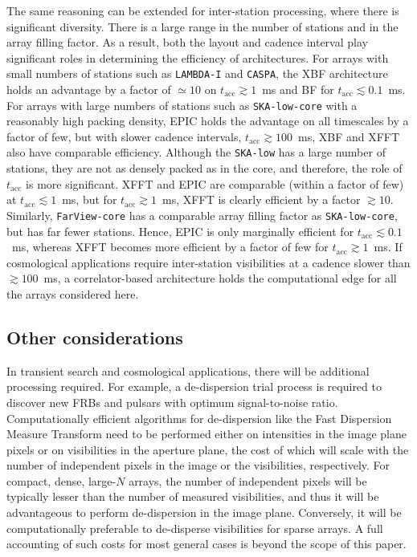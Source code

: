 \documentclass[
  journal=pasa,
  manuscript=article-type,
  year=2020,
  volume=37,
]{cup-journal}
\begin{document}
The same reasoning can be extended for inter-station processing, where there is significant diversity. There is a large range in the number of stations and in the array filling factor. As a result, both the layout and cadence interval play significant roles in determining the efficiency of architectures. For arrays with small numbers of stations such as \texttt{LAMBDA-I} and \texttt{CASPA}, the XBF architecture holds an advantage by a factor of $\simeq 10$ on $t_\textrm{acc}\gtrsim 1$~ms and BF for $t_\textrm{acc}\lesssim 0.1$~ms. For arrays with large numbers of stations such as \texttt{SKA-low-core} with a reasonably high packing density, EPIC holds the advantage on all timescales by a factor of few, but with slower cadence intervals, $t_\textrm{acc}\gtrsim 100$~ms, XBF and XFFT also have comparable efficiency. Although the \texttt{SKA-low} has a large number of stations, they are not as densely packed as in the core, and therefore, the role of $t_\textrm{acc}$ is more significant. XFFT and EPIC are comparable (within a factor of few) at $t_\textrm{acc}\lesssim 1$~ms, but for $t_\textrm{acc}\gtrsim 1$~ms, XFFT is clearly efficient by a factor $\gtrsim 10$. Similarly, \texttt{FarView-core} has a comparable array filling factor as \texttt{SKA-low-core}, but has far fewer stations. Hence, EPIC is only marginally efficient for $t_\textrm{acc}\lesssim 0.1$~ms, whereas XFFT becomes more efficient by a factor of few for $t_\textrm{acc}\gtrsim 1$~ms. If cosmological applications require inter-station visibilities at a cadence slower than $\gtrsim 100$~ms, a correlator-based architecture holds the computational edge for all the arrays considered here.

\subsection{Other considerations}\label{sec:other-metrics}

In transient search and cosmological applications, there will be additional processing required. For example, a de-dispersion trial process is required to discover new FRBs and pulsars with optimum signal-to-noise ratio. Computationally efficient algorithms for de-dispersion like the Fast Dispersion Measure Transform \citep[FDMT;][]{Zackay+2014} need to be performed either on intensities in the image plane pixels or on visibilities in the aperture plane, the cost of which will scale with the number of independent pixels in the image or the visibilities, respectively. For compact, dense, large-$N$ arrays, the number of independent pixels will be typically lesser than the number of measured visibilities, and thus it will be advantageous to perform de-dispersion in the image plane. Conversely, it will be computationally preferable to de-disperse visibilities for sparse arrays. A full accounting of such costs for most general cases is beyond the scope of this paper.
\end{document}
